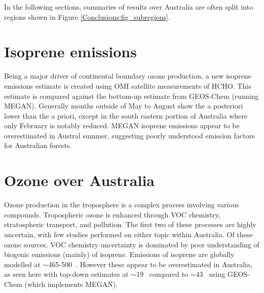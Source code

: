 
  In the following sections, summaries of results over Australia are often split into regions shown in Figure \ref{Conclusions:fig_subregions}.
  

\section{Isoprene emissions}
\label{Conclusions:isoprene}

  Being a major driver of continental boundary ozone production, a new isoprene emissions estimate is created using OMI satellite measurements of HCHO.
  This estimate is compared against the bottom-up estimate from GEOS-Chem (running MEGAN).
  Generally months outside of May to August show the a posteriori lower than the a priori, except in the south eastern portion of Australia where only February is notably reduced.
  MEGAN isoprene emissions appear to be overestimated in Austral summer, suggesting poorly understood emission factors for Australian forests.

\section{Ozone over Australia}
\label{Conclusions:ozone}
  
  Ozone production in the troposphere is a complex process involving various compounds.
  Tropospheric ozone is enhanced through VOC chemistry, stratospheric transport, and pollution.
  The first two of these processes are highly uncertain, with few studies performed on either topic within Australia.
  Of these ozone sources, VOC chemistry uncertainty is dominated by poor understanding of biogenic emissions (mainly) of isoprene.
  Emissions of isoprene are globally modelled at $\sim$465-500\tgcpyr  ~\parencite{Guenther2006, Messina2016}. 
  However these appear to be overestimated in Australia, as seen here with top-down estimates at $\sim 19$ \tgcpyr  ~compared to $\sim 43$ \tgcpyr  ~using GEOS-Chem (which implements MEGAN).
  
